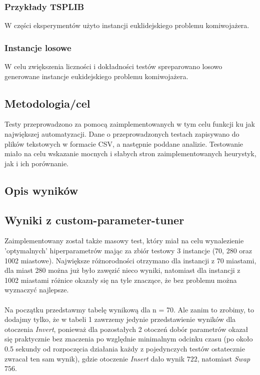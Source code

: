 \documentclass{article}
\begin{document}
\subsubsection{Przykłady TSPLIB}
W części eksperymentów użyto instancji euklidejskiego problemu komiwojażera.

\subsubsection{Instancje losowe}
W celu zwiększenia liczności i dokładności testów spreparowano losowo generowane instancje eukidejskiego problemu komiwojażera.

\subsection{Metodologia/cel}

Testy przeprowadzono za pomocą zaimplementowanych w tym celu funkcji ku jak największej automatyzacji. Dane o przeprowadzonych testach zapisywano do plików tekstowych w formacie CSV, a następnie poddane analizie. Testowanie miało na celu wskazanie mocnych i słabych stron zaimplementowanych heurystyk, jak i ich porównanie.

\subsection{Opis wyników}

\subsection{Wyniki z custom-parameter-tuner}
Zaimplementowany został także masowy test, który miał na celu wynalezienie 'optymalnych' hiperparametrów mając za zbiór testowy 3 instancje (70, 280 oraz 1002 miastowe). Największe różnorodności otrzymano dla instancji z 70 miastami, dla miast 280 można już było zawęzić nieco wyniki, natomiast dla instancji z 1002 miastami różnice okazały się na tyle znaczące, że bez problemu można wyznaczyć najlepsze.
\\\\
Na początku przedstawmy tabelę wynikową dla n = 70. Ale zanim to zrobimy, to dodajmy tylko, że w tabeli 1 zawrzemy jedynie przedstawienie wyników dla otoczenia \textit{Invert}, ponieważ dla pozostałych 2 otoczeń dobór parametrów okazał się praktycznie bez znaczenia po względnie minimalnym odcinku czasu (po około 0.5 sekundy od rozpoczęcia działania każdy z pojedynczych testów ostatecznie zwracał ten sam wynik), gdzie otoczenie \textit{Insert} dało wynik $722$, natomiast \textit{Swap} $756$.
\end{document}
